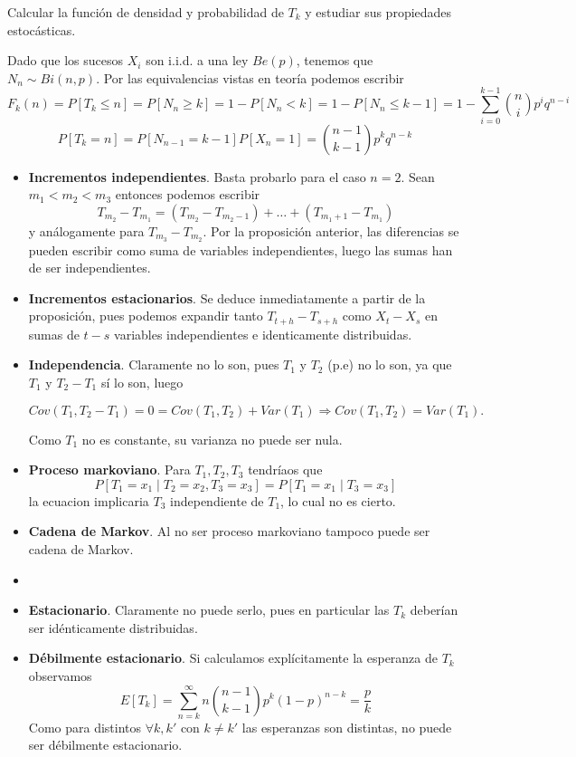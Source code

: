 \documentclass[twoside]{article}
\begin{document}
\begin{ejercicio}{4}
Calcular la función de densidad y probabilidad de $T_k$ y estudiar sus propiedades estocásticas. 
\end{ejercicio}
\begin{solucion}
Dado que los sucesos $X_i$ son i.i.d. a una ley $Be(p)$, tenemos que $N_n \sim Bi(n,p)$. Por las equivalencias vistas en teoría podemos escribir
$$
F_k(n) = P[T_k \leq n ] = P[N_n \geq k] = 1 - P[N_n < k] = 1 - P[N_n \leq k -1] = 1- \sum_{i=0}^{k-1}\binom{n}{i}p^iq^{n-i}
$$
$$
P[T_k = n] = P[N_{n-1} =k-1]P[X_n = 1] = \binom{n-1}{k-1}p^kq^{n-k}
$$
\begin{itemize}
\item \textbf{Incrementos independientes}. Basta probarlo para el caso $n=2$. Sean $m_1 < m_2 < m_3$ entonces podemos escribir
$$
T_{m_2}- T_{m_1}  = (T_{m_2}- T_{m_2-1}) + … + (T_{m_{1}+1}- T_{m_1})
$$
y análogamente para $T_{m_3}- T_{m_2}$. Por la proposición anterior, las diferencias se pueden escribir como suma de variables independientes, luego las sumas han de ser independientes.

\item \textbf{Incrementos estacionarios}. Se deduce inmediatamente a partir de la proposición, pues podemos expandir tanto $T_{t+h}-T_{s+h}$ como $X_t - X_s$ en sumas de $t-s$ variables independientes e identicamente distribuidas.

\item \textbf{Independencia}. Claramente no lo son, pues $T_1$ y $T_2$ (p.e) no lo son, ya que $T_1$ y $T_2-T_1$ sí lo son, luego 

$$
Cov(T_1,T_2-T_1) = 0 = Cov(T_1,T_2) + Var(T_1) \Rightarrow Cov(T_1,T_2) = Var(T_1). 
$$

Como $T_1$ no es constante, su varianza no puede ser nula.
\item \textbf{Proceso markoviano}. Para $T_1,T_2,T_3$ tendríaos que
$$
P[T_1 = x_1 \mid T_2 = x_2,T_3=x_3] = P[T_1=x_1\mid T_3=x_3]
$$
la ecuacion implicaria $T_3$ independiente de $T_1$, lo cual no es cierto.

\item \textbf{Cadena de Markov}. Al no ser proceso markoviano tampoco puede ser cadena de Markov.
\item 
\item \textbf{Estacionario}. Claramente no puede serlo, pues en particular las $T_k$ deberían ser idénticamente distribuidas.
\item \textbf{Débilmente estacionario}. Si calculamos explícitamente la esperanza de $T_k$ observamos
$$
E[T_k] = \sum_{n=k}^\infty n \binom{n-1}{k-1}p^k(1-p)^{n-k} = \frac{p}{k}
$$
Como para distintos $\forall k,k'$ con $k\neq k'$ las esperanzas son distintas, no puede ser débilmente estacionario.
\end{itemize}
\end{solucion}
\end{document}
